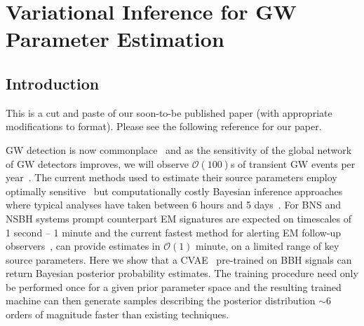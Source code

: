 \chapter{Variational Inference for GW Parameter Estimation}



%
%
%
 
%
%

\section{Introduction}

This is a cut and paste of our soon-to-be published paper (with appropriate modifications to format). Please see the following reference for our paper\cite{1909.06296}.

\ac{GW} detection is now
commonplace~\cite{PhysRevX.6.041015,PhysRevLett.119.161101} and as the
sensitivity of the global network of \ac{GW} detectors improves, we will
observe $\mathcal{O}(100)$s of transient \ac{GW} events per
year~\cite{2018LRR....21....3A}. The current methods used to estimate their
source parameters employ optimally sensitive~\cite{2009CQGra..26o5017S} but
computationally costly Bayesian inference approaches~\cite{1409.7215} where
typical analyses have taken between 6 hours and 5 days~\cite{gracedb_O3}.
%
%
For \ac{BNS} and \ac{NSBH} systems prompt counterpart \ac{EM} signatures are
expected on timescales of 1 second -- 1 minute and the current fastest method
for alerting \ac{EM} follow-up observers~\cite{2016PhRvD..93b4013S}, can
provide estimates in $\mathcal{O}(1)$ minute, on a limited range of key source
parameters. 
%
%
Here we show that a \ac{CVAE}~\cite{1904.06264,1812.04405} pre-trained on
\ac{BBH} signals can return Bayesian posterior probability estimates. The
training procedure need only be performed once for a given prior parameter
space and the resulting trained machine can then generate samples describing
the posterior distribution $\sim 6$ orders of magnitude faster than existing
techniques.
%

